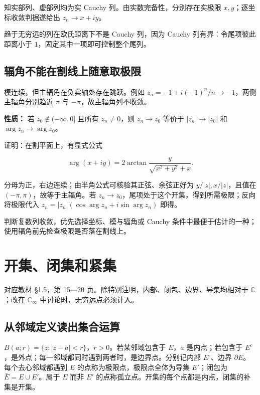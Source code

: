 \documentclass[11pt,a4paper]{article}
\begin{document}
知实部列、虚部列均为实 Cauchy 列。由实数完备性，分别存在实极限
\(x,y\)；逐坐标收敛判据遂给出 \(z_n\to x+iy\)。

趋于无穷远的列在欧氏距离下不是 Cauchy 列，因为 Cauchy
列有界：令尾项彼此距离小于 \(1\)，固定其中一项即可控制整个尾列。

\subsection{辐角不能在割线上随意取极限}\label{ux8f90ux89d2ux4e0dux80fdux5728ux5272ux7ebfux4e0aux968fux610fux53d6ux6781ux9650}

模连续，但主辐角在负实轴处存在跳跃。例如
\(z_n=-1+i(-1)^n/n\to-1\)，两侧主辐角分别趋近 \(\pi\) 与
\(-\pi\)，故主辐角列不收敛。

\textbf{性质：} 若 \(z_0\notin(-\infty,0]\) 且所有 \(z_n\ne0\)，则
\(z_n\to z_0\) 等价于 \(|z_n|\to|z_0|\) 和 \(\arg z_n\to\arg z_0\)。

证明：在割平面上，有显式公式

\[
\arg(x+iy)=2\arctan\frac{y}{\sqrt{x^2+y^2}+x}.
\]

分母为正，右边连续；由半角公式可核验其正弦、余弦正好为
\(y/|z|,x/|z|\)，且值在 \((-\pi,\pi)\)，故等于主辐角。若
\(z_n\to z_0\)，尾项处于这个开集，得到所需极限；反向将极限代入
\(z_n=|z_n|(\cos\arg z_n+i\sin\arg z_n)\) 即得。

判断复数列收敛，优先选择坐标、模与辐角或 Cauchy
条件中最便于估计的一种；使用辐角前先检查极限是否落在割线上。

\section{开集、闭集和紧集}
对应教材 §1.5，第 15---20 页。除特别注明，内部、闭包、边界、导集均相对于
\(\mathbb C\)；改在 \(\mathbb C_\infty\) 中讨论时，无穷远点必须计入。

\subsection{从邻域定义读出集合运算}\label{ux4eceux90bbux57dfux5b9aux4e49ux8bfbux51faux96c6ux5408ux8fd0ux7b97}

\(B(a;r)=\{z:|z-a|<r\}\)，\(r>0\)。若某邻域包含于 \(E\)，\(a\)
是内点；若包含于
\(E^c\)，是外点；每一邻域都同时遇到两者时，是边界点。分别记内部
\(E^\circ\)、边界 \(\partial E\)。每个去心邻域都遇到 \(E\)
的点称为极限点，极限点全体为导集 \(E'\)；闭包为
\(\bar E=E\cup E'\)。属于 \(E\) 而非 \(E'\)
的点称孤立点。开集的每个点都是内点，闭集的补集是开集。
\end{document}
